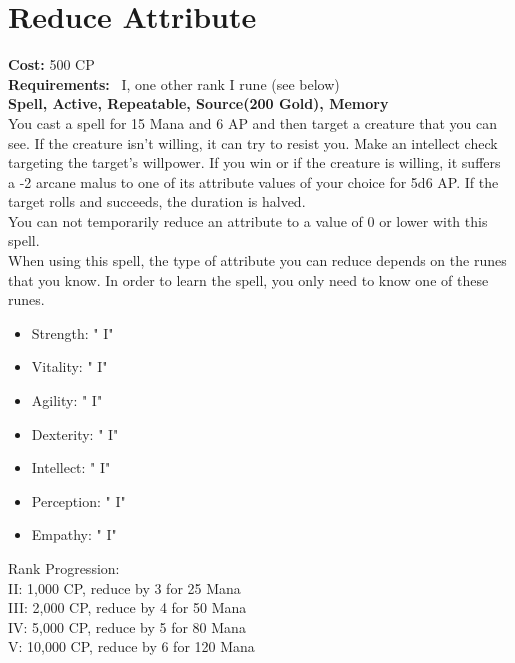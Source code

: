 \section{Reduce Attribute}\label{spell:reduceAbility}
\textbf{Cost:} 500 CP\\
\textbf{Requirements:}~ I, one other rank I rune (see below)\\
\textbf{Spell, Active, Repeatable, Source(200 Gold), Memory}\\
You cast a spell for 15 Mana and 6 AP and then target a creature that you can see.
If the creature isn't willing, it can try to resist you.
Make an intellect check targeting the target's willpower.
If you win or if the creature is willing, it suffers a -2 arcane malus to one of its attribute values of your choice for 5d6 AP.
If the target rolls and succeeds, the duration is halved.\\
You can not temporarily reduce an attribute to a value of 0 or lower with this spell. \\
When using this spell, the type of attribute you can reduce depends on the runes that you know.
In order to learn the spell, you only need to know one of these runes.\\
\begin{itemize}
    \item Strength: " I"
    \item Vitality: " I"
    \item Agility: " I"
    \item Dexterity: " I"
    \item Intellect: " I"
    \item Perception: " I"
    \item Empathy: " I"
\end{itemize}
Rank Progression:\\
II: 1,000 CP, reduce by 3 for 25 Mana\\
III: 2,000 CP, reduce by 4 for 50 Mana\\
IV: 5,000 CP, reduce by 5 for 80 Mana\\
V: 10,000 CP, reduce by 6 for 120 Mana\\